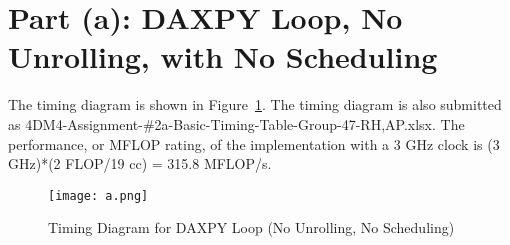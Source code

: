 \section*{Part (a): DAXPY Loop, No Unrolling, with No Scheduling}
The timing diagram is shown in Figure~\ref{fig:a}. The timing diagram is also submitted as 4DM4-Assignment-\#2a-Basic-Timing-Table-Group-47-RH,AP.xlsx. The performance, or MFLOP rating, of the implementation with a 3 GHz clock is (3 GHz)*(2 FLOP/19 cc) = 315.8 MFLOP/s.

\begin{figure}[htp]
\centering
\caption{Timing Diagram for DAXPY Loop (No Unrolling, No Scheduling)}
\texttt{[image: a.png]}
\label{fig:a}
\end{figure}